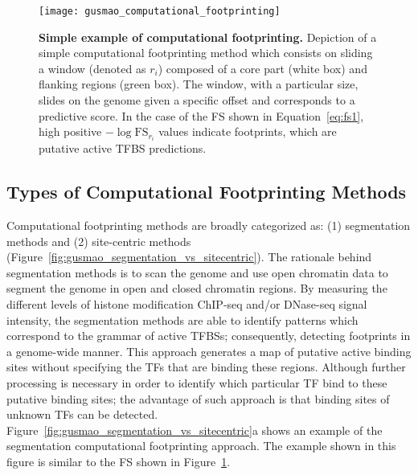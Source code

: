 \begin{figure}[h!]
\centering
\texttt{[image: gusmao\_computational\_footprinting]}
\caption[Simple example of computational footprinting]{\textbf{Simple example of computational footprinting.} Depiction of a simple computational footprinting method which consists on sliding a window (denoted as $r_i$) composed of a core part (white box) and flanking regions (green box). The window, with a particular size, slides on the genome given a specific offset and corresponds to a predictive score. In the case of the FS shown in Equation~\ref{eq:fs1}, high positive $-\log \text{FS}_{r_i}$ values indicate footprints, which are putative active TFBS predictions.}
\label{fig:gusmao_computational_footprinting}
\end{figure}

\subsection{Types of Computational Footprinting Methods}
\label{sec:types.computational.footprinting.methods}

Computational footprinting methods are broadly categorized as: (1) segmentation methods and (2) site-centric methods (Figure~\ref{fig:gusmao_segmentation_vs_sitecentric}). The rationale behind segmentation methods is to scan the genome and use open chromatin data to segment the genome in open and closed chromatin regions. By measuring the different levels of histone modification ChIP-seq and/or DNase-seq signal intensity, the segmentation methods are able to identify patterns which correspond to the grammar of active TFBSs; consequently, detecting footprints in a genome-wide manner. This approach generates a map of putative active binding sites without specifying the TFs that are binding these regions. Although further processing is necessary in order to identify which particular TF bind to these putative binding sites; the advantage of such approach is that binding sites of unknown TFs can be detected. Figure~\ref{fig:gusmao_segmentation_vs_sitecentric}a shows an example of the segmentation computational footprinting approach. The example shown in this figure is similar to the FS shown in Figure~\ref{fig:gusmao_computational_footprinting}.

